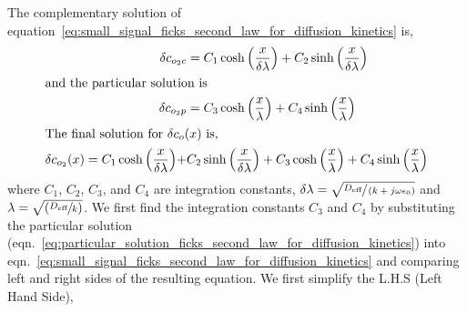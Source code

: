 \documentclass[Notes.tex]{subfiles}
\begin{document}
The complementary solution of 
equation~\ref{eq:small_signal_ficks_second_law_for_diffusion_kinetics} is,
\begin{align}
	\delta c_{o_2c} & = C_1 \cosh{\left(\frac{x}{\delta\lambda}\right)} + C_2 
	\sinh{\left(\frac{x}{\delta\lambda}\right)}\label{eq:complementary_solution_ficks_second_law_for_diffusion_kinetics}\\
	\intertext{and the particular solution is}
	\delta c_{o_2p} & = C_3 \cosh{\left(\frac{x}{\lambda}\right)} + C_4 
	\sinh{\left(\frac{x}{\lambda}\right)}\label{eq:particular_solution_ficks_second_law_for_diffusion_kinetics}\\
\intertext{The final solution for $\delta c_o(x)$ is,}
	\delta c_{o_2}(x) =  C_1 \cosh{\left(\frac{x}{\delta\lambda}\right)} + & C_2 	\sinh{\left(\frac{x}{\delta\lambda}\right)} + C_3 \cosh{\left(\frac{x}{\lambda}\right)} + C_4 	\sinh{\left(\frac{x}{\lambda}\right)}\label{eq:total_small_signal_oxygen_concentration_solution_for_diffusion_kinetics}
\end{align}
where $C_1$, $C_2$, $C_3$, and $C_4$ are integration constants, $\delta\lambda = \sqrt{\sfrac{D_{\text{eff}}}{\left(k+j\omega\epsilon_0\right)}}$ and $\lambda = \sqrt{\left(\sfrac{D_{\text{eff}}}{k}\right)}$. We first find the integration constants $C_3$ and $C_4$ by substituting the particular solution (eqn.~\ref{eq:particular_solution_ficks_second_law_for_diffusion_kinetics}) 
into eqn.~\ref{eq:small_signal_ficks_second_law_for_diffusion_kinetics} and comparing left and right sides of the resulting equation. We first simplify the L.H.S (Left Hand Side),
\end{document}
